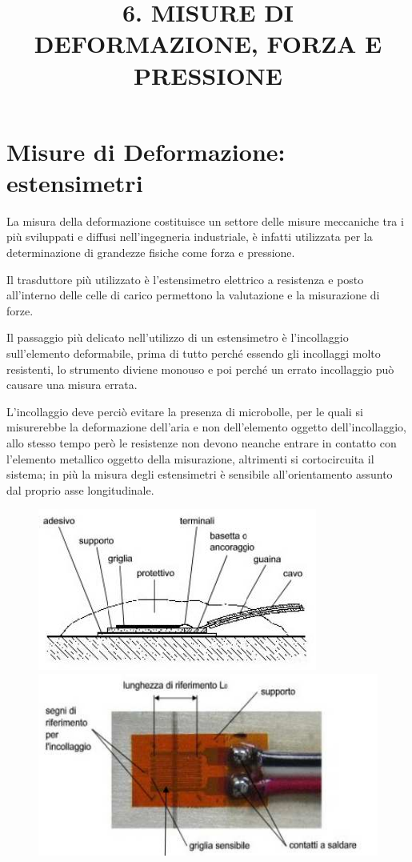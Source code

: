 \documentclass[a4paper, 15pt]{article}
\title{6. MISURE DI DEFORMAZIONE, FORZA E PRESSIONE}
\date{}
\begin{document}
	\maketitle
{}	%
\setcounter{tocdepth}{5} %
\tableofcontents 
\newpage

\section{Misure di Deformazione: estensimetri}
\begin{adjustwidth}{2in}{}
		La misura della deformazione costituisce un settore delle misure meccaniche
		tra i più sviluppati e diffusi nell’ingegneria industriale, è infatti utilizzata per la determinazione di grandezze fisiche come forza e pressione. 
		
		Il trasduttore più utilizzato è l'estensimetro elettrico a resistenza e posto all'interno delle celle di carico permettono la valutazione e la misurazione di forze. \newline 
		
		Il passaggio più delicato nell'utilizzo di un estensimetro è l'incollaggio sull'elemento deformabile, prima di tutto perché essendo gli incollaggi molto resistenti, lo strumento diviene monouso e poi perché un errato incollaggio può causare una misura errata.
		
		L'incollaggio deve perciò evitare la presenza di microbolle, per le quali si misurerebbe la deformazione dell'aria e non dell'elemento oggetto dell'incollaggio, allo stesso tempo però le resistenze non devono neanche entrare in contatto con l'elemento metallico oggetto della misurazione, altrimenti si cortocircuita il sistema; in più la misura degli estensimetri è sensibile all'orientamento assunto dal proprio asse longitudinale.		
		\begin{figure}[H]
			\centering
			\includegraphics[width=0.5\linewidth]{immagini/1}
			\includegraphics[width=0.5\linewidth]{immagini/2}
			\label{fig:screenshot1}
		\end{figure}
\end{adjustwidth}
\newpage
\end{document}

